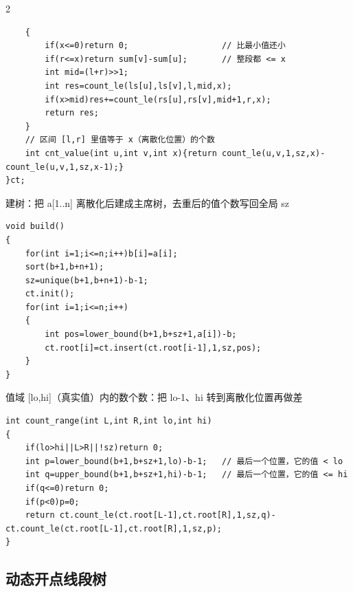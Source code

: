 \documentclass[UTF8,fontset=fandol,a4paper,twoside]{ctexart}
\newcommand{\note}[1]{{\fontsize{10}{12}\selectfont #1\par}}
\begin{document}
\begin{multicols}{2}
\begin{lstlisting}
    {
        if(x<=0)return 0;                   // 比最小值还小
        if(r<=x)return sum[v]-sum[u];       // 整段都 <= x
        int mid=(l+r)>>1;
        int res=count_le(ls[u],ls[v],l,mid,x);
        if(x>mid)res+=count_le(rs[u],rs[v],mid+1,r,x);
        return res;
    }
    // 区间 [l,r] 里值等于 x（离散化位置）的个数
    int cnt_value(int u,int v,int x){return count_le(u,v,1,sz,x)-count_le(u,v,1,sz,x-1);}
}ct;
\end{lstlisting}
\note{建树：把 a[\allowbreak{}1.\allowbreak{}.\allowbreak{}n]\allowbreak{} 离散化后建成主席树，去重后的值个数写回全局 sz}
\begin{lstlisting}
void build()
{
    for(int i=1;i<=n;i++)b[i]=a[i];
    sort(b+1,b+n+1);
    sz=unique(b+1,b+n+1)-b-1;
    ct.init();
    for(int i=1;i<=n;i++)
    {
        int pos=lower_bound(b+1,b+sz+1,a[i])-b;
        ct.root[i]=ct.insert(ct.root[i-1],1,sz,pos);
    }
}
\end{lstlisting}
\note{值域 [\allowbreak{}lo,\allowbreak{}hi]\allowbreak{}（真实值）内的数个数：把 lo-\allowbreak{}1、hi 转到离散化位置再做差}
\begin{lstlisting}
int count_range(int L,int R,int lo,int hi)
{
    if(lo>hi||L>R||!sz)return 0;
    int p=lower_bound(b+1,b+sz+1,lo)-b-1;   // 最后一个位置，它的值 < lo
    int q=upper_bound(b+1,b+sz+1,hi)-b-1;   // 最后一个位置，它的值 <= hi
    if(q<=0)return 0;
    if(p<0)p=0;
    return ct.count_le(ct.root[L-1],ct.root[R],1,sz,q)-ct.count_le(ct.root[L-1],ct.root[R],1,sz,p);
}
\end{lstlisting}
\subsection{动态开点线段树}


\end{multicols}
\end{document}

